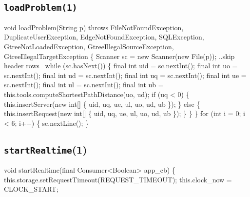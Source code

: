 \subsection{\texttt{loadProblem(1)}}
\nwenddocs{}\endmoddef{}
void loadProblem(String p)
throws FileNotFoundException, DuplicateUserException, EdgeNotFoundException, SQLException,
       GtreeNotLoadedException, GtreeIllegalSourceException, GtreeIllegalTargetException \{
  Scanner sc = new Scanner(new File(p));
  \LA{}..skip header rows~{\nwtagstyle{}}\RA{}
  while (sc.hasNext()) \{
    final int uid = sc.nextInt();
    final int  uo = sc.nextInt();
    final int  ud = sc.nextInt();
    final int  uq = sc.nextInt();
    final int  ue = sc.nextInt();
    final int  ul = sc.nextInt();
    final int  ub = this.tools.computeShortestPathDistance(uo, ud);
    if (uq < 0) \{
      this.insertServer(new int[] \{ uid, uq, ue, ul, uo, ud, ub \});
    \} else \{
      this.insertRequest(new int[] \{ uid, uq, ue, ul, uo, ud, ub \});
    \}
  \}
\}
\eatline
{}\nwendcode{}\endmoddef{}
for (int i = 0; i < 6; i++) \{
  sc.nextLine();
\}
\nwendcode{}\nwdocspar

\subsection{\texttt{startRealtime}(1)}
\nwenddocs{}\endmoddef{}
void startRealtime(final Consumer<Boolean> app_cb) \{
  this.storage.setRequestTimeout(REQUEST_TIMEOUT);
  this.clock_now = CLOCK_START;

